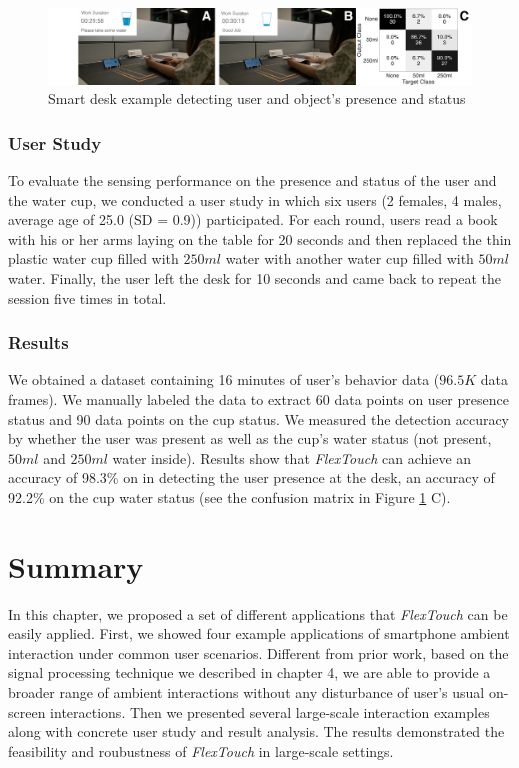 \begin{figure}[ht]
\centering
  \includegraphics[width=0.95\columnwidth]{figures/FlexTouch-desk.png}
  \setlength{\belowcaptionskip}{-4pt}
  \caption{Smart desk example detecting user and object's presence and status}
  \label{fig:smartdesk}
\end{figure}

\subsubsection{User Study}
To evaluate the sensing performance on the presence and status of the user and the water cup, we conducted a user study in which six users (2 females, 4 males, average age of 25.0 (SD = 0.9)) participated. For each round, users read a book with his or her arms laying on the table for 20 seconds and then replaced the thin plastic water cup filled with $250 ml$ water with another water cup filled with $50 ml$ water. Finally, the user left the desk for 10 seconds and came back to repeat the session five times in total.

\subsubsection{Results}
We obtained a dataset containing 16 minutes of user's behavior data ($96.5 K$ data frames). We manually labeled the data to extract 60 data points on user presence status and 90 data points on the cup status. We measured the detection accuracy by whether the user was present as well as the cup's water status (not present, $50 ml$ and $250 ml$ water inside). Results show that \textit{FlexTouch} can achieve an accuracy of 98.3\% on in detecting the user presence at the desk, an accuracy of 92.2\% on the cup water status (see the confusion matrix in Figure \ref{fig:smartdesk} C).

\section{Summary}
In this chapter, we proposed a set of different applications that \textit{FlexTouch} can be easily applied. First, we showed four example applications of smartphone ambient interaction under common user scenarios. Different from prior work, based on the signal processing technique we described in chapter 4, we are able to provide a broader range of ambient interactions without any disturbance of user's usual on-screen interactions. Then we presented several large-scale interaction examples along with concrete user study and result analysis. The results demonstrated the feasibility and roubustness of \textit{FlexTouch} in large-scale settings.
